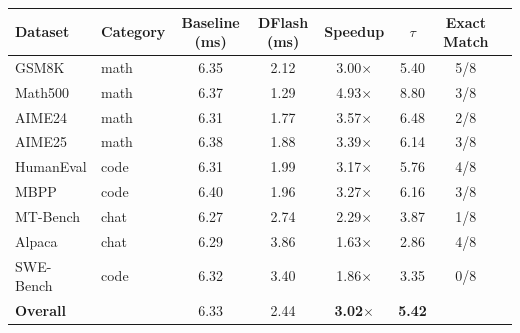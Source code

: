 \centering
\begin{tabular}{l|l|cc|cc|c|c}
\toprule
Dataset & Category & Baseline (ms) & DFlash (ms) & Speedup & $\tau$ & Exact Match \\
\midrule
GSM8K & math & 6.35 & 2.12 & 3.00$\times$ & 5.40 & 5/8 \\
Math500 & math & 6.37 & 1.29 & 4.93$\times$ & 8.80 & 3/8 \\
AIME24 & math & 6.31 & 1.77 & 3.57$\times$ & 6.48 & 2/8 \\
AIME25 & math & 6.38 & 1.88 & 3.39$\times$ & 6.14 & 3/8 \\
HumanEval & code & 6.31 & 1.99 & 3.17$\times$ & 5.76 & 4/8 \\
MBPP & code & 6.40 & 1.96 & 3.27$\times$ & 6.16 & 3/8 \\
MT-Bench & chat & 6.27 & 2.74 & 2.29$\times$ & 3.87 & 1/8 \\
Alpaca & chat & 6.29 & 3.86 & 1.63$\times$ & 2.86 & 4/8 \\
SWE-Bench & code & 6.32 & 3.40 & 1.86$\times$ & 3.35 & 0/8 \\
\midrule
\textbf{Overall} & & 6.33 & 2.44 & \textbf{3.02}$\times$ & \textbf{5.42} & \\
\bottomrule
\end{tabular}
